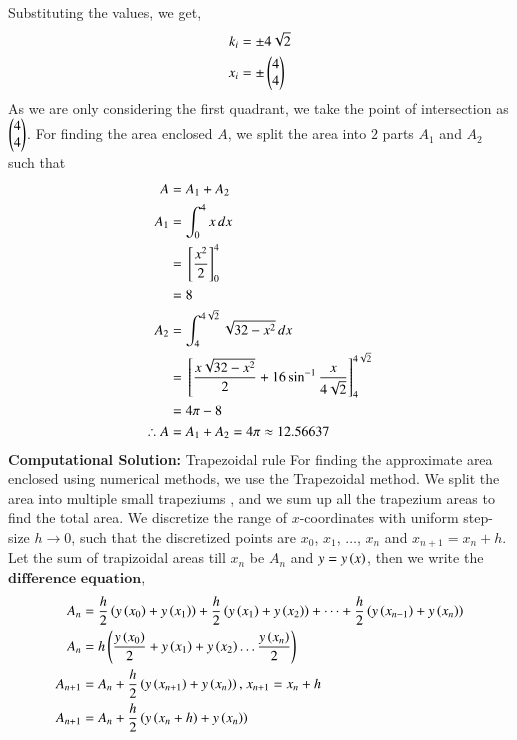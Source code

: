 \documentclass[journal]{IEEEtran}
\begin{document}
Substituting the values, we get,
\begin{align}
	k_i &= \pm 4\sqrt{2}\\
    x_i &= \pm \begin{pmatrix}4\\4\end{pmatrix}
\end{align}
As we are only considering the first quadrant, we take the point of intersection as $\begin{pmatrix}4\\4\end{pmatrix}$.
\newline
For finding the area enclosed $A$, we split the area into $2$ parts $A_1$ and $A_2$ such that
\begin{align}
    A &= A_1 + A_2 \label{eq:total_area} \\
    A_1 &= \int_{0}^{4} x \, dx \\
    &= {}\left[\frac{x^2}{2}\right]_{0}^{4} \\
    &= 8 \\
    A_2 &= \int_{4}^{4\sqrt{2}} \sqrt{32 - x^2} \, dx \\
    &= {}\left[\frac{x\sqrt{32 - x^2}}{2} + 16\sin^{-1}{\frac{x}{4\sqrt{2}}}\right]_{4}^{4\sqrt{2}} \\
    &= 4\pi - 8 \\
    \therefore A &= A_1 + A_2 = 4\pi \approx 12.56637
\end{align}
\textbf{Computational Solution:} Trapezoidal rule
\newline
For finding the approximate area enclosed using numerical methods, we use the Trapezoidal method. We split the area into multiple small trapeziums , and we sum up all the trapezium areas to find the total area. 
\newline
We discretize the range of $x$-coordinates with uniform step-size $h \to 0$, such that the discretized points are $x_0$, $x_1$, $\dots$, $x_n$ and $x_{n + 1} = x_n + h$.
\newline
Let the sum of trapizoidal areas till $x_n$ be $A_n$ and $y = y\left(x\right)$, then we write the $\textbf{difference equation}$,
\begin{align}
    A_n &= \frac{h}{2}\left(y\left(x_0\right) + y\left(x_1\right)\right) + \frac{h}{2}\left(y\left(x_1\right) + y\left(x_2\right)\right) + \dots + \frac{h}{2}\left(y\left(x_{n - 1}\right) + y\left(x_{n}\right)\right)\\
    A_n &= h\left(\frac{y\left(x_0\right)}{2} + y\left(x_1\right) + y\left(x_2\right) \dots \frac{y\left(x_n\right)}{2}\right)\\
    A_{n + 1} &= A_n + \frac{h}{2}\left(y\left(x_{n + 1}\right) + y\left(x_n\right)\right) \text{, } x_{n + 1} = x_n + h\\
    A_{n + 1} &= A_n + \frac{h}{2}\left(y\left(x_n + h\right) + y\left(x_n\right)\right)\\
\end{align}
\end{document}
